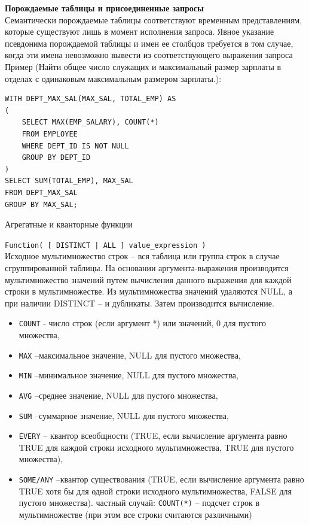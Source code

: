 \documentclass[a4paper,12pt]{article}
\begin{document}
\textbf{Порождаемые таблицы и присоединенные запросы}\\
 Семантически порождаемые таблицы соответствуют временным 
представлениям, которые существуют лишь в момент исполнения запроса. 
Явное указание псевдонима порождаемой таблицы и имен ее столбцов 
требуется в том случае, когда эти имена невозможно вывести из 
соответствующего выражения запроса
Пример (Найти общее число служащих и максимальный размер зарплаты в 
отделах с одинаковым максимальным размером зарплаты.):
\begin{lstlisting}
WITH DEPT_MAX_SAL(MAX_SAL, TOTAL_EMP) AS
(
    SELECT MAX(EMP_SALARY), COUNT(*)
    FROM EMPLOYEE
    WHERE DEPT_ID IS NOT NULL
    GROUP BY DEPT_ID
)
SELECT SUM(TOTAL_EMP), MAX_SAL 
FROM DEPT_MAX_SAL 
GROUP BY MAX_SAL;
\end{lstlisting}

Агрегатные и кванторные функции

\texttt{Function( [ DISTINCT | ALL ] value\_expression )}
 \\Исходное мультимножество строк – вся таблица или группа строк в случае 
сгруппированной таблицы. На основании аргумента-выражения производится 
мультимножество значений путем вычисления данного выражения для 
каждой строки в мультимножестве. Из мультимножества значений удаляются 
NULL, а при наличии DISTINCT – и дубликаты. Затем производится вычисление.
\begin{itemize}
    \item \texttt{COUNT} - число строк (если аргумент *) или значений, 0 для пустого множества,
    
\item \texttt{MAX} –максимальное значение, NULL для пустого множества, \item\texttt{MIN} –минимальное значение, NULL для пустого множества, \item\texttt{AVG} –среднее значение, NULL для пустого множества, \item\texttt{SUM} –суммарное значение, NULL для пустого множества, \item\texttt{EVERY} – квантор всеобщности (TRUE, если вычисление аргумента равно TRUE 
для каждой строки исходного мультимножества, TRUE для пустого множества), \item\texttt{SOME/ANY} –квантор существования (TRUE, если вычисление аргумента 
равно TRUE хотя бы для одной строки исходного мультимножества, FALSE для
 пустого множества).
   частный случай: \texttt{COUNT(*)} – подсчет строк в мультимножестве (при 
этом все строки считаются различными)
\end{itemize}
\end{document}
